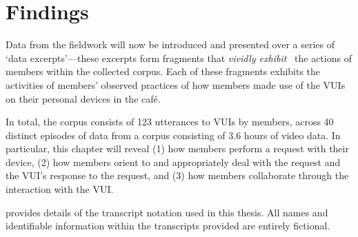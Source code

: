 \section{Findings}\label{sec:empirical cafe findings}
\begin{revisedsubmission}
Data from the fieldwork will now be introduced and presented over a series of `data excerpts'---these excerpts form fragments that \textit{vividly exhibit}~\citep{Crabtree2012} the actions of members within the collected corpus.
Each of these fragments exhibits the activities of members' observed practices of how members made use of the \acp{VUI} on their personal devices in the caf\'{e}.
\end{revisedsubmission}

In total, the corpus consists of 123 utterances to \acp{VUI} by members, across 40 distinct episodes of data from a corpus consisting of 3.6 hours of video data.
In particular, this chapter will reveal (1) how members perform a request with their device, (2) how members orient to and appropriately deal with the request and the \ac{VUI}'s response to the request, and (3) how members collaborate through the interaction with the \ac{VUI}. 

 provides details of the transcript notation used in this thesis.
All names and identifiable information within the transcripts provided are entirely fictional.

